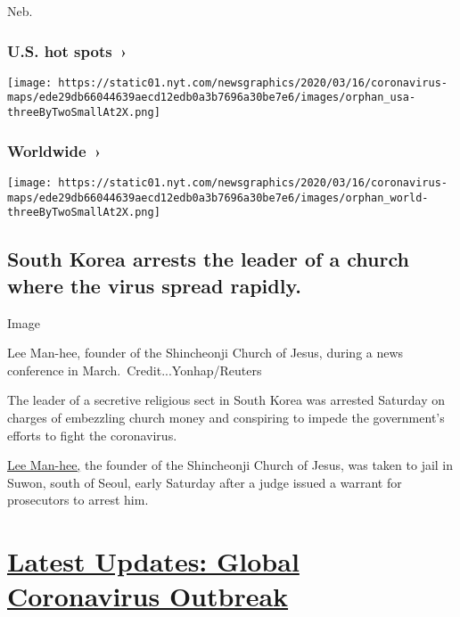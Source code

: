 Neb.

\href{https://www.nytimes.com/interactive/2020/us/coronavirus-us-cases.html}{}

\hypertarget{us-hot-spots-}{%
\subsubsection{U.S. hot spots~›}\label{us-hot-spots-}}

\texttt{[image: https://static01.nyt.com/newsgraphics/2020/03/16/coronavirus-maps/ede29db66044639aecd12edb0a3b7696a30be7e6/images/orphan\_usa-threeByTwoSmallAt2X.png]}

\href{https://www.nytimes.com/interactive/2020/world/coronavirus-maps.html}{}

\hypertarget{worldwide-}{%
\subsubsection{Worldwide~›}\label{worldwide-}}

\texttt{[image: https://static01.nyt.com/newsgraphics/2020/03/16/coronavirus-maps/ede29db66044639aecd12edb0a3b7696a30be7e6/images/orphan\_world-threeByTwoSmallAt2X.png]}

\hypertarget{south-korea-arrests-the-leader-of-a-church-where-the-virus-spread-rapidly}{%
\subsection{South Korea arrests the leader of a church where the virus
spread
rapidly.}\label{south-korea-arrests-the-leader-of-a-church-where-the-virus-spread-rapidly}}

Image

Lee Man-hee, founder of the Shincheonji Church of Jesus, during a news
conference in March.~Credit...Yonhap/Reuters

The leader of a secretive religious sect in South Korea was arrested
Saturday on charges of embezzling church money and conspiring to impede
the government's efforts to fight the coronavirus.

\href{https://www.nytimes.com/2020/03/02/world/asia/coronavirus-south-korea-shincheonji.html?searchResultPosition=1}{Lee
Man-hee,} the founder of the Shincheonji Church of Jesus, was taken to
jail in Suwon, south of Seoul, early Saturday after a judge issued a
warrant for prosecutors to arrest him.

\hypertarget{latest-updates-global-coronavirus-outbreak}{%
\section{\texorpdfstring{\href{https://www.nytimes.com/2020/08/01/world/coronavirus-covid-19.html?action=click\&pgtype=Article\&state=default\&region=MAIN_CONTENT_1\&context=storylines_live_updates}{Latest
Updates: Global Coronavirus
Outbreak}}{Latest Updates: Global Coronavirus Outbreak}}\label{latest-updates-global-coronavirus-outbreak}}


